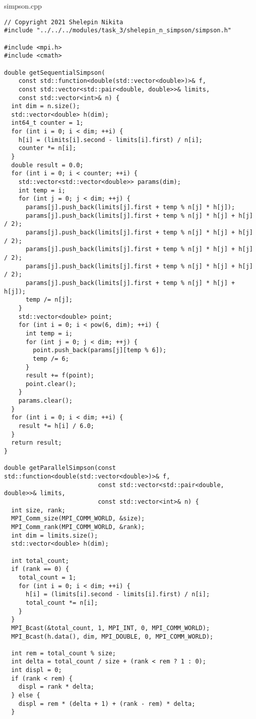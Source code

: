 \documentclass{report}
\begin{document}
simpson.cpp
\begin{lstlisting}
// Copyright 2021 Shelepin Nikita
#include "../../../modules/task_3/shelepin_n_simpson/simpson.h"

#include <mpi.h>
#include <cmath>

double getSequentialSimpson(
    const std::function<double(std::vector<double>)>& f,
    const std::vector<std::pair<double, double>>& limits,
    const std::vector<int>& n) {
  int dim = n.size();
  std::vector<double> h(dim);
  int64_t counter = 1;
  for (int i = 0; i < dim; ++i) {
    h[i] = (limits[i].second - limits[i].first) / n[i];
    counter *= n[i];
  }
  double result = 0.0;
  for (int i = 0; i < counter; ++i) {
    std::vector<std::vector<double>> params(dim);
    int temp = i;
    for (int j = 0; j < dim; ++j) {
      params[j].push_back(limits[j].first + temp % n[j] * h[j]);
      params[j].push_back(limits[j].first + temp % n[j] * h[j] + h[j] / 2);
      params[j].push_back(limits[j].first + temp % n[j] * h[j] + h[j] / 2);
      params[j].push_back(limits[j].first + temp % n[j] * h[j] + h[j] / 2);
      params[j].push_back(limits[j].first + temp % n[j] * h[j] + h[j] / 2);
      params[j].push_back(limits[j].first + temp % n[j] * h[j] + h[j]);
      temp /= n[j];
    }
    std::vector<double> point;
    for (int i = 0; i < pow(6, dim); ++i) {
      int temp = i;
      for (int j = 0; j < dim; ++j) {
        point.push_back(params[j][temp % 6]);
        temp /= 6;
      }
      result += f(point);
      point.clear();
    }
    params.clear();
  }
  for (int i = 0; i < dim; ++i) {
    result *= h[i] / 6.0;
  }
  return result;
}

double getParallelSimpson(const std::function<double(std::vector<double>)>& f,
                          const std::vector<std::pair<double, double>>& limits,
                          const std::vector<int>& n) {
  int size, rank;
  MPI_Comm_size(MPI_COMM_WORLD, &size);
  MPI_Comm_rank(MPI_COMM_WORLD, &rank);
  int dim = limits.size();
  std::vector<double> h(dim);

  int total_count;
  if (rank == 0) {
    total_count = 1;
    for (int i = 0; i < dim; ++i) {
      h[i] = (limits[i].second - limits[i].first) / n[i];
      total_count *= n[i];
    }
  }
  MPI_Bcast(&total_count, 1, MPI_INT, 0, MPI_COMM_WORLD);
  MPI_Bcast(h.data(), dim, MPI_DOUBLE, 0, MPI_COMM_WORLD);

  int rem = total_count % size;
  int delta = total_count / size + (rank < rem ? 1 : 0);
  int displ = 0;
  if (rank < rem) {
    displ = rank * delta;
  } else {
    displ = rem * (delta + 1) + (rank - rem) * delta;
  }


\end{lstlisting}
\end{document}
